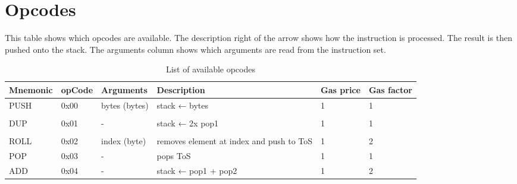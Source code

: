 \chapter{Opcodes}
This table shows which opcodes are available. The description right of the arrow shows how the instruction is processed. The result is then pushed onto the stack. The arguments column shows which arguments are read from the instruction set.
\begin{longtable}[c]{L{2.5cm} L{1cm} L{3cm} L{5.5cm} R{0.8cm} R{1cm} }
\caption{List of available opcodes}
\label{opcode_table}\\
\toprule
Mnemonic  & opCode & Arguments 
& Description                                                                                                 & Gas price & Gas factor \\* \toprule
\endhead
%
\bottomrule
\endfoot
%
\endlastfoot
%
PUSH      & 0x00   & bytes (bytes)
	& stack ← bytes
	& 1         & 1          \\\\
DUP       & 0x01   & -                                                                                                        & stack ← 2x pop1                                                                                             & 1         & 1          \\\\
ROLL      & 0x02   & index (byte)                                                                                             & removes element at index and push to ToS                                                                    & 1         & 2          \\
POP       & 0x03   & -                                                                                                        & pops ToS                                                                                                    & 1         & 1          \\
ADD       & 0x04   & -                                                                                                        & stack ← pop1 + pop2                                                                                         & 1         & 2          \\

\end{longtable}
